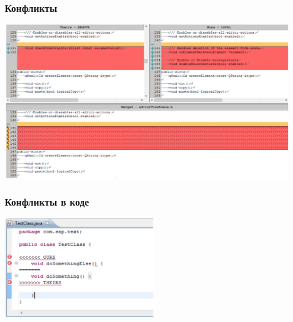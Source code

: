 \documentclass[xetex,mathserif,serif]{beamer}
\begin{document}
	\begin{frame}
		\frametitle{Конфликты}
		\begin{center}
			\includegraphics[width=0.95\textwidth]{conflicts.png}
		\end{center}
	\end{frame}

	\begin{frame}
		\frametitle{Конфликты в коде}
		\begin{center}
			\includegraphics[width=0.5\textwidth]{conflictsInCode.png}
		\end{center}
	\end{frame}
\end{document}
